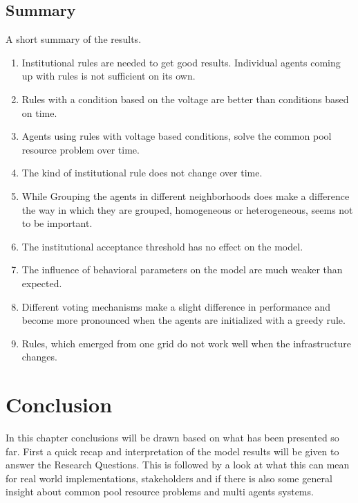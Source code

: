 \documentclass[a4paper]{article}
\begin{document}
\subsection{Summary}
A short summary of the results. 
\begin{enumerate}
 \item Institutional rules are needed to get good results. Individual agents coming up with rules is not 
sufficient on its own.
 \item Rules with a condition based on the voltage are better than conditions based on time. 
 \item Agents using rules with voltage based conditions, solve the common pool resource problem over time.
 \item The kind of institutional rule does not change over time.
 \item While Grouping the agents in different neighborhoods does make a difference the way in which they are grouped, 
homogeneous or heterogeneous, seems not to be important. 
 \item The institutional acceptance threshold has no effect on the model.
 \item The influence of behavioral parameters on the model are much weaker than expected.
 \item Different voting mechanisms make a slight difference in performance and become more pronounced when the agents are initialized with a greedy rule.
 \item Rules, which emerged from one grid do not work well when the infrastructure changes.
\end{enumerate}

\clearpage

\section{Conclusion}
In this chapter conclusions will be drawn based on what has been presented so far. First a quick recap and interpretation of the
model results will be given to answer the Research Questions. 
This is followed by a look at what this can mean for real world implementations, stakeholders  and if there is also some 
general insight about common pool resource problems and multi agents systems. 
\end{document}
